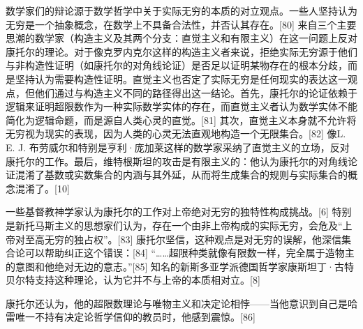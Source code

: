 数学家们的辩论源于数学哲学中关于实际无穷的本质的对立观点。一些人坚持认为无穷是一个抽象概念，在数学上不具备合法性，并否认其存在。[80] 来自三个主要思潮的数学家（构造主义及其两个分支：直觉主义和有限主义）在这一问题上反对康托尔的理论。对于像克罗内克尔这样的构造主义者来说，拒绝实际无穷源于他们与非构造性证明（如康托尔的对角线论证）是否足以证明某物存在的根本分歧，而是坚持认为需要构造性证明。直觉主义也否定了实际无穷是任何现实的表达这一观点，但他们通过与构造主义不同的路径得出这一结论。首先，康托尔的论证依赖于逻辑来证明超限数作为一种实际数学实体的存在，而直觉主义者认为数学实体不能简化为逻辑命题，而是源自人类心灵的直觉。[81] 其次，直觉主义本身就不允许将无穷视为现实的表现，因为人类的心灵无法直观地构造一个无限集合。[82] 像L. E. J. 布劳威尔和特别是亨利·庞加莱这样的数学家采纳了直觉主义的立场，反对康托尔的工作。最后，维特根斯坦的攻击是有限主义的：他认为康托尔的对角线论证混淆了基数或实数集合的内涵与其外延，从而将生成集合的规则与实际集合的概念混淆了。[10]

一些基督教神学家认为康托尔的工作对上帝绝对无穷的独特性构成挑战。[6] 特别是新托马斯主义的思想家们认为，存在一个由非上帝构成的实际无穷，会危及“上帝对至高无穷的独占权”。[83] 康托尔坚信，这种观点是对无穷的误解，他深信集合论可以帮助纠正这个错误：[84] “……超限种类就像有限数一样，完全属于造物主的意图和他绝对无边的意志。”[85] 知名的新斯多亚学派德国哲学家康斯坦丁·古特贝尔特支持这种理论，认为它并不与上帝的本质相对立。[8]

康托尔还认为，他的超限数理论与唯物主义和决定论相悖——当他意识到自己是哈雷唯一不持有决定论哲学信仰的教员时，他感到震惊。[86]